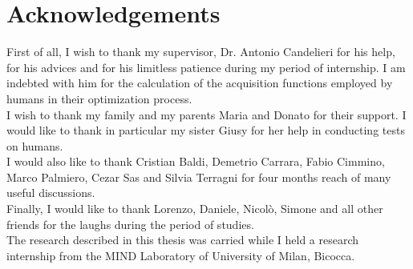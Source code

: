 \chapter*{Acknowledgements}
\pagestyle{empty}

First of all, I wish to thank my supervisor, Dr. Antonio Candelieri for his help, for his advices and for his limitless patience during my period of internship. I am indebted with him for the calculation of the acquisition functions employed by humans in their optimization process. \\

I wish to thank my family and my parents Maria and Donato for their support. I would like to thank in particular my sister Giusy for her help in conducting tests on humans. \\

I would also like to thank Cristian Baldi, Demetrio Carrara, Fabio Cimmino, Marco Palmiero, Cezar Sas and Silvia Terragni for four months reach of many useful discussions. \\

Finally, I would like to thank Lorenzo, Daniele, Nicolò, Simone  and all other friends for the laughs during the period of studies. \\

The research described in this thesis was carried while I held a research internship from the MIND Laboratory of University of Milan, Bicocca. \\

